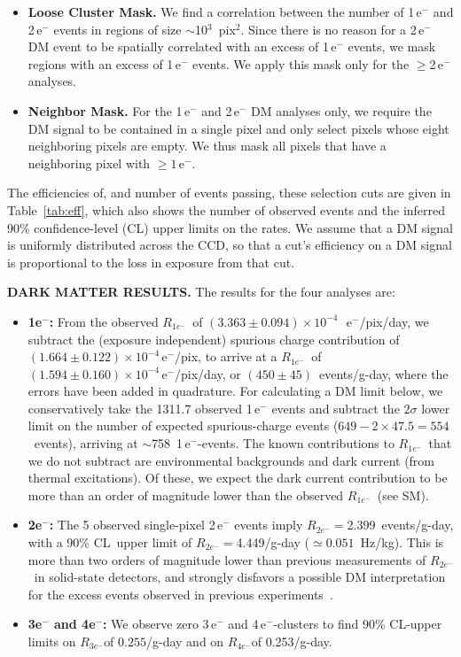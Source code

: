 \documentclass[aps,prl,twocolumn,showpacs,superscriptaddress,preprintnumbers]{revtex4-1}
\newcommand{\unit}[1]{\ensuremath{\mathrm{\,#1}}\xspace}
\newcommand{\e}{\unit{e^{-}}}
\newcommand{\Rs}{$R_{1e^-}$}
\newcommand{\Rtwo}{$R_{2e^-}$}
\newcommand{\Rthree}{$R_{3e^-}$}
\newcommand{\Rfour}{$R_{4e^-}$}
\begin{document}
\begin{itemize}[leftmargin=*]
%
\item {\bf Loose Cluster Mask.}  
We find a correlation between the number of 1\e and 2\e events in regions of size $\sim$10$^3$~pix$^2$. Since there is no reason for a 2\e DM event to be spatially correlated with an excess of 1\e events, we mask regions with an excess of 1\e events. We apply this mask only for the $\ge$2\e analyses.
%
\item{\bf Neighbor Mask.} For the 1\e and 2\e DM analyses only, we require the DM signal to be contained in a single pixel and only select pixels whose eight neighboring pixels are empty. We thus mask all pixels that have a neighboring pixel with $\ge1\e$.
\end{itemize}%

The efficiencies of, and number of events passing, these selection cuts are given in Table~\ref{tab:eff}, which also shows the number of observed events and the inferred 90\% confidence-level (CL) upper limits on the rates. We assume that a DM signal is uniformly distributed across the CCD, so that a cut's efficiency on a DM signal is proportional to the loss in exposure from that cut. 


\noindent\textbf{DARK MATTER RESULTS.}
The results for the four analyses are: 
\begin{itemize}[leftmargin=*]\addtolength{\itemsep}{-0.7\baselineskip}
%
\item \textbf{1e$^{-}$:} 
From the observed \Rs\ of $(3.363\pm 0.094) \times 10^{-4}$~\e/pix/day, we subtract the (exposure independent) spurious charge contribution of $(1.664 \pm 0.122)\times 10^{-4}$\e/pix, to arrive at a \Rs\ of 
$(1.594 \pm 0.160)\times 10^{-4}$\e/pix/day, or $(450\pm 45)$~events/g-day, where the errors have been added in quadrature.
For calculating a DM limit below, we conservatively take the 1311.7 observed 1\e events and subtract the $2\sigma$ lower limit on the number of expected spurious-charge events ($649-2\times 47.5=554$~events), arriving at $\sim$758~1\e-events.  The known contributions to \Rs\ that we do not subtract are environmental backgrounds and dark current (from thermal excitations). Of these, we expect the dark current contribution to be more than an order of magnitude lower than the observed \Rs\ (see SM).
%
\item \textbf{2e$^{-}$:} The 5 observed single-pixel 2\e events imply 
\Rtwo$=$2.399~events/g-day, with a 90\% CL~upper limit of \Rtwo$=$4.449/g-day ($\simeq 0.051$~Hz/kg).  This is more than two orders of magnitude lower than previous measurements of \Rtwo\ in solid-state detectors, and strongly disfavors a possible DM interpretation for the excess events observed in previous experiments~\cite{Kurinsky:2020dpb}. 
\item \textbf{3e$^{-}$ and 4e$^{-}$:} We observe zero 3\e and 4\e-clusters to find 90\% CL-upper limits on \Rthree of $0.255$/g-day and on \Rfour of 0.253/g-day. 
\end{itemize}
\end{document}
